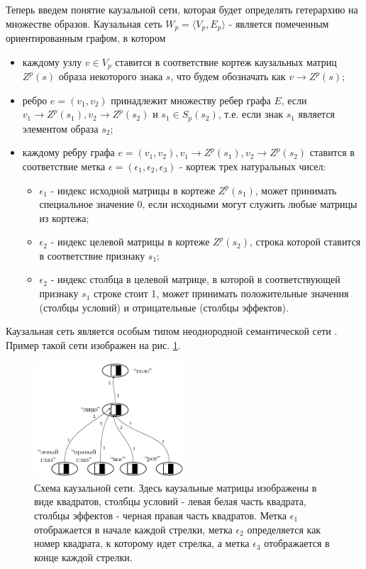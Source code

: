 \documentclass[12pt]{scrartcl}
\begin{document}
	Теперь введем понятие каузальной сети, которая будет определять гетерархию на множестве образов. Каузальная сеть $W_p=\langle V_p, E_p \rangle$ - является помеченным ориентированным графом, в котором
	\begin{itemize}
		\item каждому узлу $v\in V_p$ ставится в соответствие кортеж каузальных матриц $Z^p(s)$ образа некоторого знака $s$, что будем обозначать как $v\rightarrow Z^p(s)$;
		\item ребро $e=(v_1, v_2)$ принадлежит множеству ребер графа $E$, если $v_1\rightarrow Z^p(s_1), v_2\rightarrow Z^p(s_2)$ и $s_1\in S_p(s_2)$, т.е. если знак $s_1$ является элементом образа $s_2$;
		\item каждому ребру графа $e=(v_1, v_2), v_1\rightarrow Z^p(s_1), v_2\rightarrow Z^p(s_2)$ ставится в соответствие метка $\epsilon=(\epsilon_1,\epsilon_2,\epsilon_3)$ - кортеж трех натуральных чисел:
		\begin{itemize}
			\item $\epsilon_1$ - индекс исходной матрицы в кортеже $Z^p(s_1)$, может принимать специальное значение 0, если исходными могут служить любые матрицы из кортежа;
			\item $\epsilon_2$ - индекс целевой матрицы в кортеже $Z^p(s_2)$, строка которой ставится в соответствие признаку $s_1$;
			\item $\epsilon_2$ - индекс столбца в целевой матрице, в которой в соответствующей признаку $s_1$ строке стоит 1, может принимать положительные значения (столбцы условий) и отрицательные (столбцы эффектов).
		\end{itemize}		
	\end{itemize}
	
	Каузальная сеть является особым типом неоднородной семантической сети \cite{Osipov1990}. Пример такой сети изображен на рис. \ref{fig:caus_net}.

	\begin{figure}[h]
		\centering
		\includegraphics[width=0.5\textwidth,page=1]{examples/causnet/caus_net}
		\caption{Схема каузальной сети. Здесь каузальные матрицы изображены в виде квадратов, столбцы условий - левая белая часть квадрата, столбцы эффектов - черная правая часть квадратов. Метка $\epsilon_1$ отображается в начале каждой стрелки, метка $\epsilon_2$ определяется как номер квадрата, к которому идет стрелка, а метка $\epsilon_3$ отображается в конце каждой стрелки.}
		\label{fig:caus_net}		
	\end{figure}
		
\end{document}
